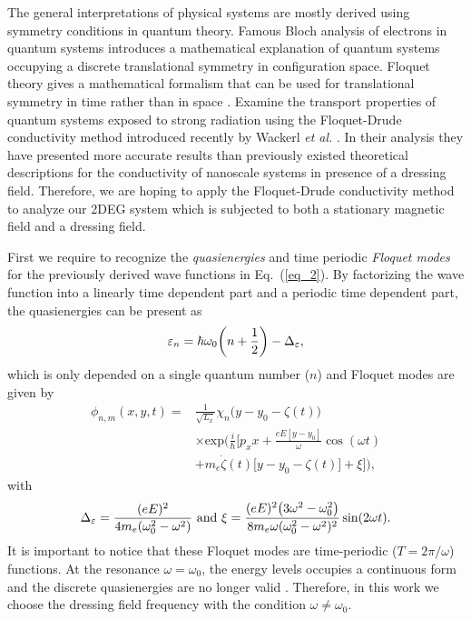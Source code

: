 
The general interpretations of physical systems are mostly derived using symmetry conditions in quantum theory. Famous Bloch analysis of electrons in quantum systems introduces a mathematical explanation of quantum systems occupying a discrete translational symmetry in configuration space. Floquet theory gives a mathematical formalism that can be used for translational symmetry in time rather than in space \cite{floquet83,grifoni98,holthaus15}. Examine the transport properties of quantum systems exposed to strong radiation using the Floquet-Drude conductivity method introduced recently by Wackerl \textit{et al.} \cite{wackerl20}. In their analysis they have presented more accurate results than previously existed theoretical descriptions for the conductivity of nanoscale systems in presence of a dressing field. Therefore, we are hoping to apply the Floquet-Drude conductivity method to analyze our 2DEG system which is subjected to both a stationary magnetic field and a dressing field.

First we require to recognize the \textit{quasienergies} and time periodic \textit{Floquet modes} \cite{grifoni98} for the previously derived wave functions in Eq.~(\ref{eq_2}). By factorizing the wave function into a linearly time dependent part and a periodic time dependent part, the quasienergies can be present as
\begin{equation} \label{eq_6}
  \varepsilon_{n} =
  \hbar \omega_0\qty(n + \frac{1}{2}) - \Delta_{\varepsilon},
\end{equation}
which is only depended on a single quantum number ($n$) and Floquet modes are given by
\begin{equation} \label{eq_7}
  \begin{aligned}
    \phi_{n,m}(x,y,t) = &
    \frac{1}{\sqrt{L_x}} \chi_{n}\big(y - y_0 - \zeta(t)\big)\\
    & \times
    \text{exp}\bigg(
     \frac{i}{\hbar}\bigg[
     p_x x +
     \frac{eE[y - y_0]}{\omega}\cos(\omega t) \\
     & +
     m_e\dot{\zeta}(t)\big[y - y_0 -\zeta(t)\big]
     + \xi \bigg]\bigg),
  \end{aligned}
\end{equation}
with
\begin{equation} \label{eq_8}
  \Delta_{\varepsilon} = \frac{(eE)^2}{4m_e(\omega_0^2 - \omega^2)} ~ \text{and} ~
  \xi = \frac{(eE)^2\qty(3\omega^2 - \omega_0^2)}{8m_e\omega(\omega_0^2 - \omega^2)^2} \sin(2\omega t).
\end{equation}
It is important to notice that these Floquet modes are time-periodic ($T=2\pi/\omega$) functions. At the resonance $\omega = \omega_0$, the energy levels occupies a continuous form and the discrete quasienergies are no longer valid \cite{popov70}. Therefore, in this work we choose the dressing field frequency with the condition $\omega \neq \omega_0$.

